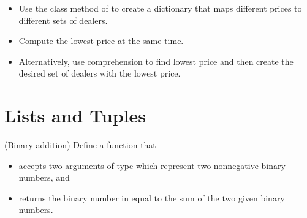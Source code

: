 \documentclass[letterpaper,10pt,english]{sphinxmanual}
\begin{document}
\begin{sphinxVerbatim}[commandchars=\\\{\}]
    \PYG{p}{]}
      
\end{sphinxVerbatim}
\begin{itemize}
\item {} 
Use the class method  of  to create a dictionary that maps different prices to different sets of dealers.

\item {} 
Compute the lowest price at the same time.

\item {} 
Alternatively, use comprehension to find lowest price and then create the desired set of dealers with the lowest price.

\end{itemize}


\section{Lists and Tuples}
\label{\detokenize{Review/Review Questions:lists-and-tuples}}
 (Binary addition) Define a function  that
\begin{itemize}
\item {} 
accepts two arguments of type  which represent two non\sphinxhyphen{}negative binary numbers, and

\item {} 
returns the binary number in  equal to the sum of the two given binary numbers.

\end{itemize}
\end{document}
